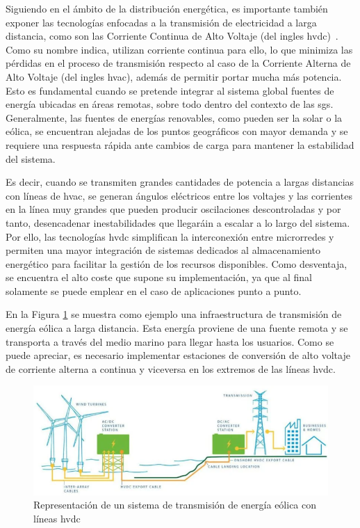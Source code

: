\pagebreak

Siguiendo en el ámbito de la distribución energética, es importante también exponer las tecnologías enfocadas a la transmisión de electricidad a larga distancia, como son las Corriente Continua de Alto Voltaje (del ingles \gls{hvdc})~\cite{hvdc}. Como su nombre indica, utilizan corriente continua para ello, lo que minimiza las pérdidas en el proceso de transmisión respecto al caso de la Corriente Alterna de Alto Voltaje (del ingles \gls{hvac}), además de permitir portar mucha más potencia. Esto es fundamental cuando se pretende integrar al sistema global fuentes de energía ubicadas en áreas remotas, sobre todo dentro del contexto de las \gls{sg}s. Generalmente, las fuentes de energías renovables, como pueden ser la solar o la eólica, se encuentran alejadas de los puntos geográficos con mayor demanda y se requiere una respuesta rápida ante cambios de carga para mantener la estabilidad del sistema. 

\vspace{3mm}

Es decir, cuando se transmiten grandes cantidades de potencia a largas distancias con líneas de \gls{hvac}, se generan ángulos eléctricos entre los voltajes y las corrientes en la línea muy grandes que pueden producir oscilaciones descontroladas y por tanto, desencadenar inestabilidades que llegaráin a escalar a lo largo del sistema. Por ello, las tecnologías \gls{hvdc} simplifican la interconexión entre microrredes y permiten una mayor integración de sistemas dedicados al almacenamiento energético para facilitar la gestión de los recursos disponibles. Como desventaja, se encuentra el alto coste que supone su implementación, ya que al final solamente se puede emplear en el caso de aplicaciones punto a punto.

\vspace{3mm}

En la Figura \ref{fig:hvdc} se muestra como ejemplo una infraestructura de transmisión de energía eólica a larga distancia. Esta energía proviene de una fuente remota y se transporta a través del medio marino para llegar hasta los usuarios. Como se puede apreciar, es necesario implementar estaciones de conversión de alto voltaje de corriente alterna a continua y viceversa en los extremos de las líneas \gls{hvdc}.

\begin{figure}[h!]
  \centering
  \includegraphics[width=1\textwidth]{img/teoria/hvdc.png}
  \caption{Representación de un sistema de transmisión de energía eólica con líneas \acrshort{hvdc}~\cite{hvdc2}}
  \label{fig:hvdc}
\end{figure}

